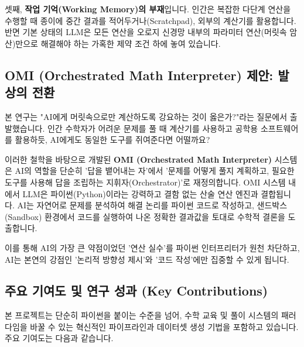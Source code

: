 셋째, \textbf{작업 기억(Working Memory)의 부재}입니다. 인간은 복잡한 다단계 연산을 수행할 때 종이에 중간 결과를 적어두거나(Scratchpad), 외부의 계산기를 활용합니다. 반면 기본 상태의 LLM은 모든 연산을 오로지 신경망 내부의 파라미터 연산(머릿속 암산)만으로 해결해야 하는 가혹한 제약 조건 하에 놓여 있습니다.

\subsection{OMI (Orchestrated Math Interpreter) 제안: 발상의 전환}
본 연구는 "AI에게 머릿속으로만 계산하도록 강요하는 것이 옳은가?"라는 질문에서 출발했습니다. 인간 수학자가 어려운 문제를 풀 때 계산기를 사용하고 공학용 소프트웨어를 활용하듯, AI에게도 동일한 도구를 쥐여준다면 어떨까요?

이러한 철학을 바탕으로 개발된 \textbf{OMI (Orchestrated Math Interpreter)} 시스템은 AI의 역할을 단순히 '답을 뱉어내는 자'에서 '문제를 어떻게 풀지 계획하고, 필요한 도구를 사용해 답을 조립하는 지휘자(Orchestrator)'로 재정의합니다. OMI 시스템 내에서 LLM은 파이썬(Python)이라는 강력하고 결함 없는 산술 연산 엔진과 결합됩니다. AI는 자연어로 문제를 분석하여 해결 논리를 파이썬 코드로 작성하고, 샌드박스(Sandbox) 환경에서 코드를 실행하여 나온 정확한 결과값을 토대로 수학적 결론을 도출합니다. 

이를 통해 AI의 가장 큰 약점이었던 '연산 실수'를 파이썬 인터프리터가 원천 차단하고, AI는 본연의 강점인 '논리적 방향성 제시'와 '코드 작성'에만 집중할 수 있게 됩니다.

\subsection{주요 기여도 및 연구 성과 (Key Contributions)}
본 프로젝트는 단순히 파이썬을 붙이는 수준을 넘어, 수학 교육 및 풀이 시스템의 패러다임을 바꿀 수 있는 혁신적인 파이프라인과 데이터셋 생성 기법을 포함하고 있습니다. 주요 기여도는 다음과 같습니다.

